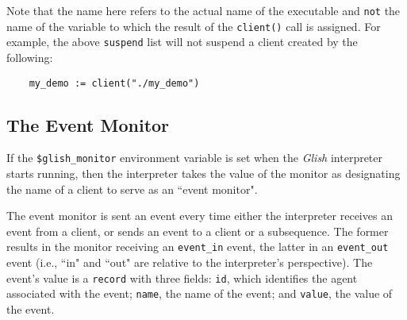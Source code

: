 \begin{sloppy}
Note that the name here refers to the actual name of the executable
and {\tt not} the name of the variable to which the result of the
{\tt client()} call is assigned.  For example, the above {\tt suspend}
list will not suspend a client created by the following:
\begin{verbatim}
    my_demo := client("./my_demo")
\end{verbatim}

\subsection{The Event Monitor}
\label{event-monitor}

If the {\tt \$glish\_monitor} environment variable is set when 
the {\em Glish} interpreter starts running, then 
the interpreter takes the value of
the monitor as designating the name of a client to 
serve as an ``event
monitor".

The event monitor is sent an event every time either the interpreter
receives an event from a client, or sends an event to a client or a
subsequence.  The former results in the monitor receiving an {\tt event\_in}
event, the latter in an {\tt event\_out} event (i.e., ``in" and ``out"
are relative to the interpreter's perspective).  The event's value
is a {\tt record} with three fields: {\tt id}, which identifies the
agent associated with the event; {\tt name}, the name of the event;
and {\tt value}, the value of the event.

\end{sloppy}
